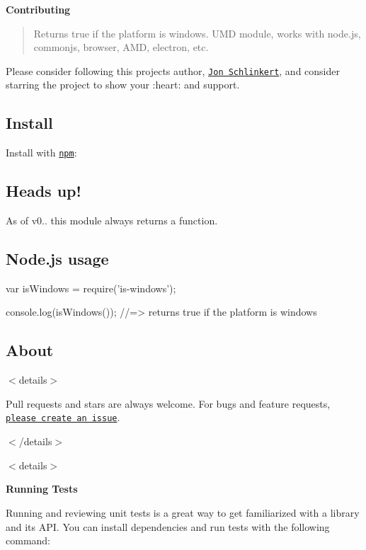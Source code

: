 {\bfseries Contributing}

\begin{quote}
Returns true if the platform is windows. U\+MD module, works with node.\+js, commonjs, browser, A\+MD, electron, etc. \end{quote}


Please consider following this project\textquotesingle{}s author, \href{https://github.com/jonschlinkert}{\tt Jon Schlinkert}, and consider starring the project to show your \+:heart\+: and support.

\subsection*{Install}

Install with \href{https://www.npmjs.com/}{\tt npm}\+:




\subsection*{Heads up!}

As of {\ttfamily v0..} this module always returns a function.

\subsection*{Node.\+js usage}


\begin{DoxyCode}
var isWindows = require('is-windows');

console.log(isWindows());
//=> returns true if the platform is windows
\end{DoxyCode}


\subsection*{About}

$<$details$>$

Pull requests and stars are always welcome. For bugs and feature requests, \href{../../issues/new}{\tt please create an issue}.

$<$/details$>$

$<$details$>$ 

{\bfseries Running Tests}

Running and reviewing unit tests is a great way to get familiarized with a library and its A\+PI. You can install dependencies and run tests with the following command\+:


